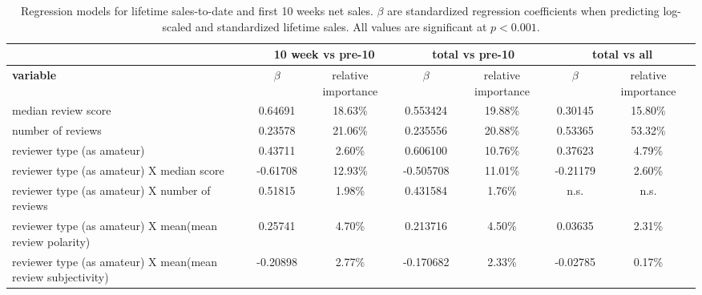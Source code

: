 \documentclass[letterpaper]{article}
\begin{document}
\begin{table}[tb]
\centering
\scriptsize
\begin{tabular}{|l|c|c|c|c|c|c|}
\hline & \multicolumn{2}{|c|}{\textbf{10 week vs pre-10}} & \multicolumn{2}{|c|}{\textbf{total vs pre-10}} & \multicolumn{2}{|c|}{\textbf{total vs all}}\\ 
\hline \textbf{variable} & \textbf{$\beta$} & relative importance & \textbf{$\beta$} & relative importance & \textbf{$\beta$} & relative importance\\ 
\hline median review score & 0.64691 & 18.63\% & 0.553424 & 19.88\% & 0.30145 & 15.80\%\\ 
\hline number of reviews & 0.23578 & 21.06\% & 0.235556 & 20.88\% & 0.53365 & 53.32\%\\ 
\hline reviewer type (as amateur) & 0.43711 & 2.60\% & 0.606100 & 10.76\% & 0.37623 & 4.79\%\\ 
\hline reviewer type (as amateur) X median score  & -0.61708 & 12.93\% & -0.505708 & 11.01\% & -0.21179 & 2.60\%\\  
\hline reviewer type (as amateur) X number of reviews & 0.51815 & 1.98\% & 0.431584 & 1.76\% & n.s. & n.s. \\ 
\hline reviewer type (as amateur) X mean(mean review polarity) & 0.25741 & 4.70\% & 0.213716 & 4.50\% & 0.03635 & 2.31\%\\ 
\hline reviewer type (as amateur) X mean(mean review subjectivity) & -0.20898 & 2.77\% & -0.170682 & 2.33\% & -0.02785 & 0.17\%\\ 
\hline 
\end{tabular}
\caption{Regression models for lifetime sales-to-date and first 10 weeks net sales. $\beta$ are standardized regression coefficients when predicting log-scaled and standardized lifetime sales. All values are significant at $p < 0.001$.}
\label{tab:sales_allmodel_lm}
\end{table}

\end{document}

